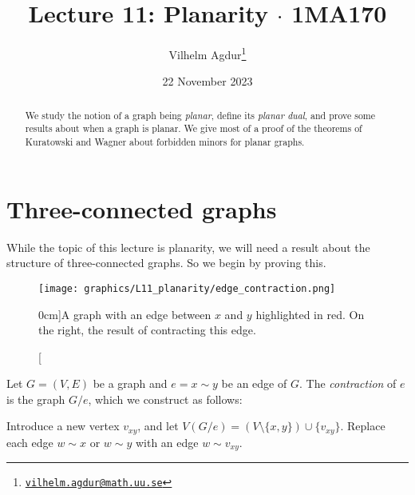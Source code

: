 \documentclass[nobib]{tufte-handout}
\title{Lecture 11: Planarity $\cdot$ 1MA170}
\author[Vilhelm Agdur]{Vilhelm Agdur\thanks{\href{mailto:vilhelm.agdur@math.uu.se}{\nolinkurl{vilhelm.agdur@math.uu.se}}}}
\date{22 November 2023}
\begin{document}
\maketitle%

\begin{abstract}
\noindent
We study the notion of a graph being \emph{planar}, define its \emph{planar dual}, and prove some results about when a graph is planar. We give most of a proof of the theorems of Kuratowski and Wagner about forbidden minors for planar graphs.
\end{abstract}

\section{Three-connected graphs}

While the topic of this lecture is planarity, we will need a result about the structure of three-connected graphs. So we begin by proving this.

\begin{figure}
  \centering
  \texttt{[image: graphics/L11\_planarity/edge\_contraction.png]}
  \caption[][0cm]{A graph with an edge between $x$ and $y$ highlighted in red. On the right, the result of contracting this edge.}
  \label{fig:edge_contraction}
\end{figure}

\begin{definition}
  Let $G = (V,E)$ be a graph and $e = x\sim y$ be an edge of $G$. The \emph{contraction} of $e$ is the graph $G/e$, which we construct as follows:

  Introduce a new vertex $v_{xy}$, and let $V(G/e) = (V \setminus \{x,y\}) \cup \{v_{xy}\}$. Replace each edge $w \sim x$ or $w \sim y$ with an edge $w \sim v_{xy}$.
\end{definition}
\end{document}
